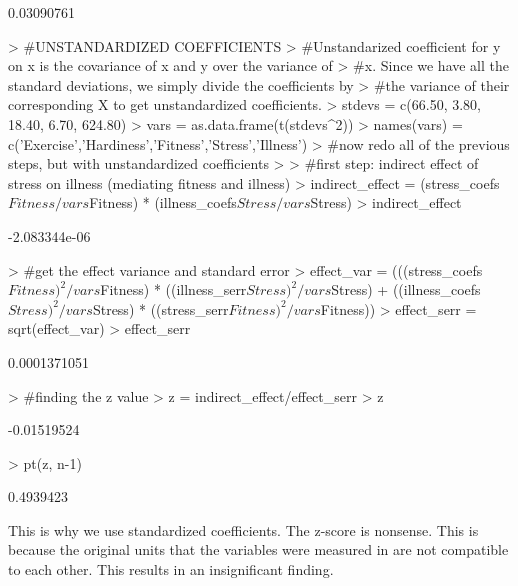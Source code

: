 \documentclass{article}
\begin{document}
\begin{Schunk}
\begin{Soutput}
[1] 0.03090761
\end{Soutput}
\begin{Sinput}
> #UNSTANDARDIZED COEFFICIENTS
> #Unstandarized coefficient for y on x is the covariance of x and y over the variance of 
> #x.  Since we have all the standard deviations, we simply divide the coefficients by 
> #the variance of their corresponding X to get unstandardized coefficients.
> stdevs = c(66.50, 3.80, 18.40, 6.70, 624.80)
> vars = as.data.frame(t(stdevs^2))
> names(vars) = c('Exercise','Hardiness','Fitness','Stress','Illness')
> #now redo all of the previous steps, but with unstandardized coefficients
> 
> #first step: indirect effect of stress on illness (mediating fitness and illness)
> indirect_effect = (stress_coefs$Fitness / vars$Fitness) * (illness_coefs$Stress / vars$Stress)
> indirect_effect
\end{Sinput}
\begin{Soutput}
[1] -2.083344e-06
\end{Soutput}
\begin{Sinput}
> #get the effect variance and standard error
> effect_var = (((stress_coefs$Fitness)^2 / vars$Fitness) * ((illness_serr$Stress)^2 / vars$Stress) +
                 ((illness_coefs$Stress)^2 / vars$Stress) * ((stress_serr$Fitness)^2 / vars$Fitness))
>               effect_serr = sqrt(effect_var)
>               effect_serr
\end{Sinput}
\begin{Soutput}
[1] 0.0001371051
\end{Soutput}
\begin{Sinput}
>               #finding the z value
>               z = indirect_effect/effect_serr
>               z
\end{Sinput}
\begin{Soutput}
[1] -0.01519524
\end{Soutput}
\begin{Sinput}
>               pt(z, n-1)
\end{Sinput}
\begin{Soutput}
[1] 0.4939423
\end{Soutput}
\end{Schunk}
This is why we use standardized coefficients.  The z-score is nonsense.  This is because the original units that the variables were measured in are not compatible to each other.  This results in an insignificant finding.  
\end{document}
